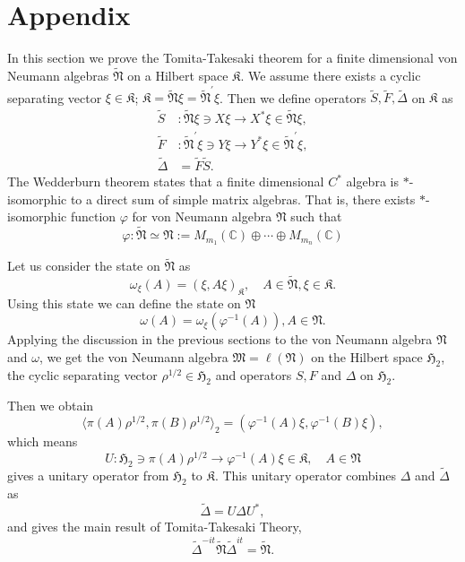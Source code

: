 \section{Appendix}
In this section we prove the Tomita-Takesaki theorem for a finite dimensional
von Neumann algebras $\tilde{\mathfrak{N}}$ on a Hilbert space $\mathfrak{K}$.
We assume there exists a cyclic separating vector $\xi\in \mathfrak{K}$;
$\mathfrak{K}=\tilde{\mathfrak{N}}\xi=\tilde{\mathfrak{N}}^\prime\xi$.
Then we define operators $\tilde{S},\tilde{F},\tilde{\Delta}$ on $\mathfrak{K}$ as
\begin{equation}
\begin{split}
\tilde{S}&:\tilde{\mathfrak{N}}\xi\ni X\xi \to X^\ast \xi \in \tilde{\mathfrak{N}}\xi,\\
\tilde{F}&:\tilde{\mathfrak{N}}^\prime\xi\ni Y\xi \to Y^\ast \xi \in \tilde{\mathfrak{N}}^\prime\xi,\\
\tilde{\Delta}&=\tilde{F}\tilde{S}.
\end{split}
\end{equation}
The Wedderburn theorem states that a finite dimensional $C^{\ast}$ algebra is  $\ast$-isomorphic to a direct sum of simple matrix algebras. That is, there exists $\ast$-isomorphic function $\varphi$ for von Neumann algebra $\mathfrak{N}$ such that
$$
\varphi:\tilde{\mathfrak{N}}\simeq \mathfrak{N}:=M_{m_1}(\mathbb{C})\oplus \cdots \oplus M_{m_n}(\mathbb{C})
$$

Let us consider the state on $\tilde{\mathfrak{N}}$ as
$$
\omega_\xi(A)=(\xi,A\xi)_{\mathfrak{K}},\quad A\in \tilde{\mathfrak{N}},\xi\in \mathfrak{K}.
$$
Using this state we can define the state on $\mathfrak{N}$
$$
\omega(A)=\omega_\xi(\varphi^{-1}(A)),A\in \mathfrak{N}.
$$
Applying the discussion in the previous sections to the von Neumann algebra $\mathfrak{N}$ and 
$\omega$, we get
the von Neumann algebra $\mathfrak{M}=\ell (\mathfrak{N})$ on the Hilbert space 
$\mathfrak{H}_2$, the cyclic separating vector $\rho^{1/2}\in \mathfrak{H}_2$
and operators $S, F$ and $\Delta$ on $\mathfrak{H}_2$.

Then we obtain
$$
\langle \pi(A)\rho^{1/2},\pi( B)\rho^{1/2}\rangle_2=(\varphi^{-1}(A)\xi,\varphi^{-1}(B)\xi),
$$
which means
$$
U:\mathfrak{H}_2\ni\pi(A)\rho^{1/2}\to \varphi^{-1}(A)\xi\in\mathfrak{K}, \quad A\in \mathfrak{N}
$$
gives a unitary operator from $\mathfrak{H}_2$ to $\mathfrak{K}$.
This unitary operator combines $\Delta$ and $\tilde{\Delta}$ as
$$
\tilde{\Delta}=U\Delta U^{\ast},
$$
and gives the main result of Tomita-Takesaki Theory,
$$
\tilde{\Delta}^{-it}\tilde{\mathfrak{N}}\tilde{\Delta}^{it}=\tilde{\mathfrak{N}}.
$$


